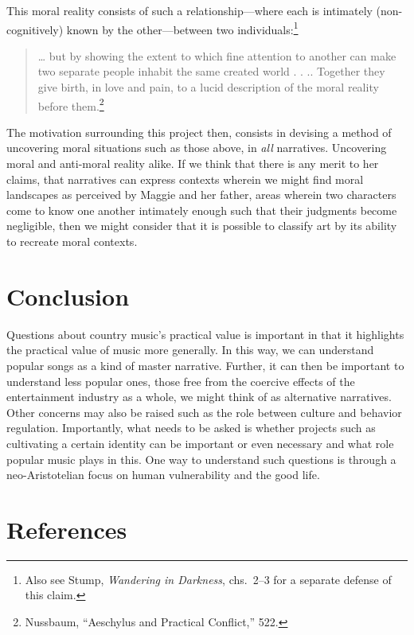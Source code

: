 \documentclass[
  12pt,
]{book}
\theoremstyle{definition}
\theoremstyle{definition}
\theoremstyle{definition}
\theoremstyle{definition}
\theoremstyle{remark}
\begin{document}
This moral reality consists of such a relationship---where each is intimately (non-cognitively) known by the other---between two individuals:\footnote{Also see Stump, \emph{Wandering in {Darkness}}, chs.~2--3 for a separate defense of this claim.}

\begin{quote}
\ldots{} but by showing the extent to which fine attention to another can make two separate people inhabit the same created world . . .. Together they give birth, in love and pain, to a lucid description of the moral reality before them.\footnote{Nussbaum, {``Aeschylus and Practical Conflict,''} 522.}
\end{quote}

The motivation surrounding this project then, consists in devising a method of uncovering moral situations such as those above, in \emph{all} narratives. Uncovering moral and anti-moral reality alike. If we think that there is any merit to her claims, that narratives can express contexts wherein we might find moral landscapes as perceived by Maggie and her father, areas wherein two characters come to know one another intimately enough such that their judgments become negligible, then we might consider that it is possible to classify art by its ability to recreate moral contexts.

\chapter{Conclusion}\label{conclusion-1}

Questions about country music's practical value is important in that it highlights the practical value of music more generally. In this way, we can understand popular songs as a kind of master narrative. Further, it can then be important to understand less popular ones, those free from the coercive effects of the entertainment industry as a whole, we might think of as alternative narratives. Other concerns may also be raised such as the role between culture and behavior regulation. Importantly, what needs to be asked is whether projects such as cultivating a certain identity can be important or even necessary and what role popular music plays in this. One way to understand such questions is through a neo-Aristotelian focus on human vulnerability and the good life.

\chapter{References}\label{references}
\end{document}
